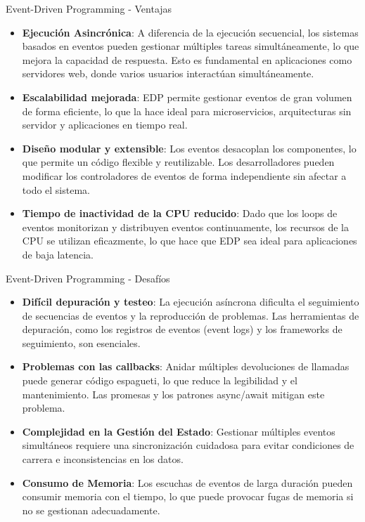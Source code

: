 \documentclass[11pt]{beamer}
\begin{document}
	\begin{frame}{Event-Driven Programming - Ventajas}
		\small
	\begin{itemize}
		\item \textbf{Ejecución Asincrónica}: A diferencia de la ejecución secuencial, los sistemas basados en eventos pueden gestionar múltiples tareas simultáneamente, lo que mejora la capacidad de respuesta. Esto es fundamental en aplicaciones como servidores web, donde varios usuarios interactúan simultáneamente.
		\item \textbf{Escalabilidad mejorada}: EDP permite gestionar eventos de gran volumen de forma eficiente, lo que la hace ideal para microservicios, arquitecturas sin servidor y aplicaciones en tiempo real.
		\item \textbf{Diseño modular y extensible}: Los eventos desacoplan los componentes, lo que permite un código flexible y reutilizable. Los desarrolladores pueden modificar los controladores de eventos de forma independiente sin afectar a todo el sistema.
		\item \textbf{Tiempo de inactividad de la CPU reducido}: Dado que los loops de eventos monitorizan y distribuyen eventos continuamente, los recursos de la CPU se utilizan eficazmente, lo que hace que EDP sea ideal para aplicaciones de baja latencia.
	\end{itemize} 
	\end{frame}

	\begin{frame}{Event-Driven Programming - Desafíos}
	\small
	\begin{itemize}
	\item \textbf{Difícil depuración y testeo}: La ejecución asíncrona dificulta el seguimiento de secuencias de eventos y la reproducción de problemas. Las herramientas de depuración, como los registros de eventos (event logs) y los frameworks de seguimiento, son esenciales.
	\item \textbf{Problemas con las callbacks}: Anidar múltiples devoluciones de llamadas puede generar código espagueti, lo que reduce la legibilidad y el mantenimiento. Las promesas y los patrones async/await mitigan este problema.
	\item \textbf{Complejidad en la Gestión del Estado}: Gestionar múltiples eventos simultáneos requiere una sincronización cuidadosa para evitar condiciones de carrera e inconsistencias en los datos.
	\item \textbf{Consumo de Memoria}: Los escuchas de eventos de larga duración pueden consumir memoria con el tiempo, lo que puede provocar fugas de memoria si no se gestionan adecuadamente.
	\end{itemize} 
	\end{frame}
\end{document}
